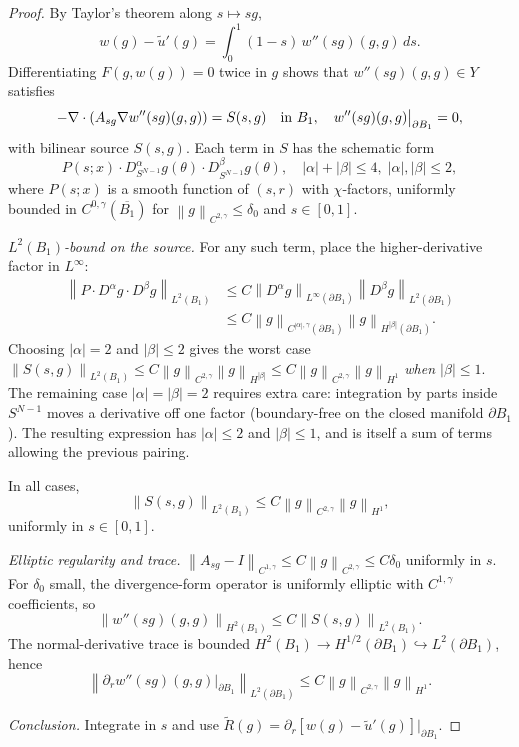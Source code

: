 \documentclass[11pt]{article}
\theoremstyle{definition}
\newcommand{\norm}[1]{\left\|#1\right\|}
\newcommand{\abs}[1]{\left|#1\right|}
\renewcommand{\d}{\,d}
\begin{document}
\begin{proof}
By Taylor's theorem along $s\mapsto sg$,
\[
w(g)-\widetilde u'(g)=\int_0^1(1-s)\,w''(sg)(g,g)\d s.
\]
Differentiating $F(g,w(g))=0$ twice in $g$ shows that $w''(sg)(g,g)\in Y$
satisfies
\begin{equation}\label{eq:w''}
-\nabla\cdot(A_{sg}\nabla w''(sg)(g,g))=S(s,g)\quad\hbox{in }B_1,\quad
w''(sg)(g,g)\big|_{\partial B_1}=0,
\end{equation}
with bilinear source $S(s,g)$. Each term in $S$ has the schematic form
\[
P(s;x)\cdot D^\alpha_{S^{N-1}}g(\theta)\cdot D^\beta_{S^{N-1}}g(\theta),
\quad\abs\alpha+\abs\beta\le 4,\;\abs\alpha,\abs\beta\le 2,
\]
where $P(s;x)$ is a smooth function of $(s,r)$ with $\chi$-factors, uniformly
bounded in $C^{0,\gamma}(\overline{B_1})$ for $\norm{g}_{C^{2,\gamma}}\le\delta_0$
and $s\in[0,1]$.

\emph{$L^2(B_1)$-bound on the source.} For any such term, place the
higher-derivative factor in $L^\infty$:
\begin{align*}
\norm{P\cdot D^\alpha g\cdot D^\beta g}_{L^2(B_1)}
&\le C\norm{D^\alpha g}_{L^\infty(\partial B_1)}\norm{D^\beta g}_{L^2(\partial B_1)}\\
&\le C\norm{g}_{C^{\abs\alpha,\gamma}(\partial B_1)}\norm{g}_{H^{\abs\beta}(\partial B_1)}.
\end{align*}
Choosing $\abs\alpha=2$ and $\abs\beta\le 2$ gives the worst case
$\norm{S(s,g)}_{L^2(B_1)}\le C\norm{g}_{C^{2,\gamma}}\norm{g}_{H^{\abs\beta}}
\le C\norm{g}_{C^{2,\gamma}}\norm{g}_{H^1}$ \emph{when $\abs\beta\le 1$}. The
remaining case $\abs\alpha=\abs\beta=2$ requires extra care: integration by
parts inside $S^{N-1}$ moves a derivative off one factor (boundary-free on
the closed manifold $\partial B_1$). The resulting expression has
$\abs\alpha\le 2$ and $\abs\beta\le 1$, and is itself a sum of terms
allowing the previous pairing.

In all cases,
\[
\norm{S(s,g)}_{L^2(B_1)}\le C\norm{g}_{C^{2,\gamma}}\norm{g}_{H^1},
\]
uniformly in $s\in[0,1]$.

\emph{Elliptic regularity and trace.}
$\norm{A_{sg}-I}_{C^{1,\gamma}}\le C\norm{g}_{C^{2,\gamma}}\le C\delta_0$
uniformly in $s$. For $\delta_0$ small, the divergence-form operator is
uniformly elliptic with $C^{1,\gamma}$ coefficients, so
\[
\norm{w''(sg)(g,g)}_{H^2(B_1)}\le C\norm{S(s,g)}_{L^2(B_1)}.
\]
The normal-derivative trace is bounded $H^2(B_1)\to
H^{1/2}(\partial B_1)\hookrightarrow L^2(\partial B_1)$, hence
\[
\norm{\partial_r w''(sg)(g,g)\big|_{\partial B_1}}_{L^2(\partial B_1)}
\le C\norm{g}_{C^{2,\gamma}}\norm{g}_{H^1}.
\]

\emph{Conclusion.} Integrate in $s$ and use $\widetilde R(g)
=\partial_r[w(g)-\widetilde u'(g)]\big|_{\partial B_1}$.
\end{proof}
\end{document}
